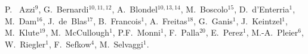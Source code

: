 P. ~Azzi$^{{9}}$,
G.~Bernardi$^{{10, 11, 12}}$,
A.~Blondel$^{{10, 13, 14}}$,
M.~Boscolo$^{{15}}$,
D.~{d'E}nterria$^{{1}}$,
M.~Dam$^{{16}}$,
J.~de~Blas$^{{17}}$,
B.~Francois$^{{1}}$,
A.~Freitas$^{{18}}$,
G.~Ganis$^{{1}}$,
J.~Keintzel$^{{1}}$,
M.~Klute$^{{19}}$,
M.~McCullough$^{{1}}$,
P.F.~Monni$^{{1}}$,
F.~Palla$^{{20}}$,
E.~Perez$^{{1}}$,
M.-A.~Pleier$^{{6}}$,
W.~Riegler$^{{1}}$,
F.~Sefkow$^{{4}}$,
M.~Selvaggi$^{{1}}$.